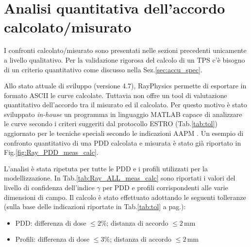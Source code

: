 \section{Analisi quantitativa dell'accordo calcolato/misurato}
I confronti calcolato/misurato sono presentati nelle sezioni precedenti unicamente a livello qualitativo. Per la validazione rigorosa del calcolo di un TPS c'è bisogno di un criterio quantitativo come discusso nella Sez.\ref{sec:accu_spec}. 

Allo stato attuale di sviluppo (versione 4.7), RayPhysics permette di esportare in formato ASCII le curve calcolate. Tuttavia non offre un tool di valutazione quantitativo dell'accordo tra il misurato ed il calcolato. Per questo motivo è stato sviluppato \textit{in-house} un programma in linguaggio MATLAB capace di analizzare le curve secondo i criteri suggeriti dal protocollo ESTRO \cite{Mijnheer2004} (Tab.\ref{tab:tol}) aggiornato per le tecniche speciali secondo le indicazioni AAPM \cite{Ezzell2009}. Un esempio di confronto quantitativo di una PDD calcolata e misurata è stato già riportato in Fig.\ref{fig:Ray_PDD_meas_calc}.

L'analisi è stata ripetuta per tutte le PDD e i profili utilizzati per la modellizzazione. In Tab.\ref{tab:Ray_ALL_meas_calc} sono riportati i valori del livello di confidenza dell'indice $\gamma$ per PDD e profili corrispondenti alle varie dimensioni di campo. Il calcolo è stato effettuato adottando le seguenti tolleranze (sulla base delle indicazioni riportate in Tab.\ref{tab:tol} a pag.\pageref{tab:tol}):
\begin{itemize}
\item PDD: differenza di dose $\leq 2\%$; distanza di accordo $\leq 2\,$mm
\item Profili: differenza di dose $\leq 3\%$; distanza di accordo $\leq 2\,$mm
\end{itemize}

